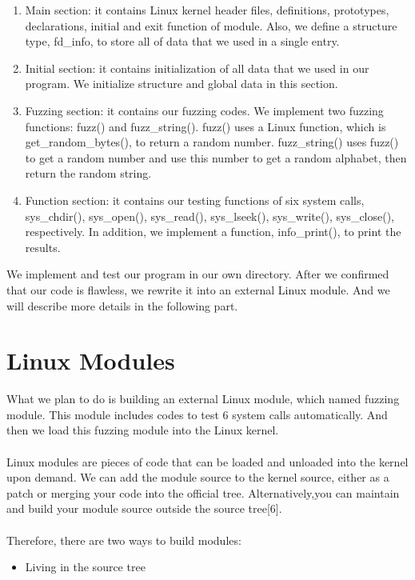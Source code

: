 \documentclass[twoside]{article}
\begin{document}
\begin{multicols}{2}
\begin{enumerate}
\item Main section: it contains Linux kernel header files, definitions, prototypes, declarations, initial and exit function of module. Also, we define a structure type, fd\_info, to store all of data that we used in a single entry.  
\item Initial section: it contains initialization of all data that we used in our program. We initialize structure and global data in this section.
\item Fuzzing section: it contains our fuzzing codes. We implement two fuzzing functions: fuzz() and fuzz\_string(). fuzz() uses a Linux function, which is get\_random\_bytes(), to return a random number. fuzz\_string() uses fuzz() to get a random number and use this number to get a random alphabet, then return the random string.
\item Function section: it contains our testing functions of six system calls, sys\_chdir(), sys\_open(), sys\_read(), sys\_lseek(), sys\_write(), sys\_close(), respectively. In addition, we implement a function, info\_print(), to print the results.
\end{enumerate}
\noindent
We implement and test our program in our own directory. After we confirmed that our code is flawless, we rewrite it into an external Linux module. And we will describe more details in the following part.

\section{Linux Modules}

What we plan to do is building an external Linux module, which named fuzzing module. This module includes codes to test 6 system calls automatically. And then we load this fuzzing module into the Linux kernel. 
\\\\
\noindent
Linux modules are pieces of code that can be loaded and unloaded into the kernel upon demand. We can add the module source to the kernel source, either as a patch or merging your code into the official tree. Alternatively,you can maintain and build your module source outside the source tree[6].
\\\\
\noindent
Therefore, there are two ways to build  modules:

\begin{itemize}

\item Living in the source tree


\end{itemize}
\end{multicols}
\end{document}
